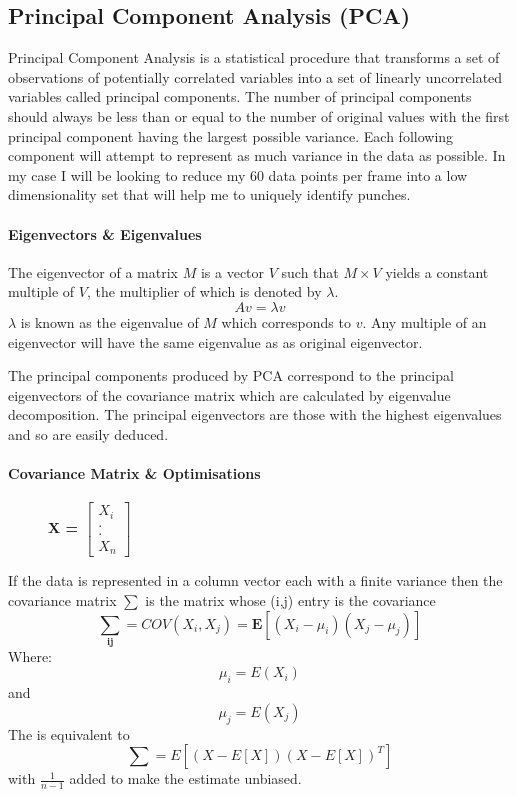 \subsection{Principal Component Analysis (PCA)}
\label{subsec:subsec01}
Principal Component Analysis is a statistical procedure that transforms a set of observations of potentially correlated variables into a set of linearly uncorrelated variables called principal components. The number of principal components should always be less than or equal to the number of original values with the first principal component having the largest possible variance. Each following component will attempt to represent as much variance in the data as possible. In my case I will be looking to reduce my 60 data points per frame into a low dimensionality set that will help me to uniquely identify punches.

\paragraph{Eigenvectors \& Eigenvalues}
The eigenvector of a matrix $M$ is a vector $V$ such that $M\times V$ yields a constant multiple of $V$, the multiplier of which is denoted by $\lambda.$
$$Av = \lambda v$$
$\lambda$ is known as the eigenvalue of $M$ which corresponds to $v$. Any multiple of an eigenvector will have the same eigenvalue as as original eigenvector.

The principal components produced by PCA correspond to the principal eigenvectors of the covariance matrix which are calculated by eigenvalue decomposition. The principal eigenvectors are those with the highest eigenvalues and so are easily deduced. 

\paragraph{Covariance Matrix \& Optimisations }
\begin{figure}
\vspace{-15pt}
\hspace{15pt}
\bf{X = } $\begin{bmatrix} X_i\\.\\.\\X_n \end{bmatrix}$\newline
\end{figure}
If the data is represented in a column vector each with a finite variance then the covariance matrix $\mathbf{\sum}$ is the matrix whose (i,j) entry is the covariance
$$\mathbf{\sum_{ij}} = COV(X_i,X_j) = \mathbf{E}[(X_i - \mu_i )(X_j - \mu_j )]$$
Where:
$$\mu_i = E(X_i)$$ and $$\mu_j = E(X_j)$$
The is equivalent to $$\mathbf{\sum} = E[(X-E[X])(X-E[X])^T]$$ 
with $\frac{1} {n-1}$ added to make the estimate unbiased.

